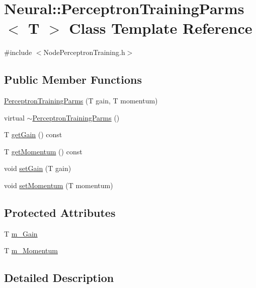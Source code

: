 \hypertarget{class_neural_1_1_perceptron_training_parms}{
\section{Neural::PerceptronTrainingParms$<$ T $>$ Class Template Reference}
\label{class_neural_1_1_perceptron_training_parms}
}


{\ttfamily \#include $<$NodePerceptronTraining.h$>$}

\subsection*{Public Member Functions}
\begin{DoxyCompactItemize}
\item 
\hyperlink{class_neural_1_1_perceptron_training_parms_a40784eca0cccf63426c0b23a8c1b5294}{PerceptronTrainingParms} (T gain, T momentum)
\item 
virtual \hyperlink{class_neural_1_1_perceptron_training_parms_a1dbdad8f7f8ad56ec69de9e3e6b34a27}{$\sim$PerceptronTrainingParms} ()
\item 
T \hyperlink{class_neural_1_1_perceptron_training_parms_a18410d759d8cf73d850235b01c7dd86a}{getGain} () const 
\item 
T \hyperlink{class_neural_1_1_perceptron_training_parms_ac4b5890cc4cea95f8e53064abedf1f6e}{getMomentum} () const 
\item 
void \hyperlink{class_neural_1_1_perceptron_training_parms_a6d7d75b1055cd7dddb6927a4f76e5f7b}{setGain} (T gain)
\item 
void \hyperlink{class_neural_1_1_perceptron_training_parms_aa20ea06d897899dba0836b4d50a21d43}{setMomentum} (T momentum)
\end{DoxyCompactItemize}
\subsection*{Protected Attributes}
\begin{DoxyCompactItemize}
\item 
T \hyperlink{class_neural_1_1_perceptron_training_parms_aea261e20f5d0108bd5be074b142eb164}{m\_\-Gain}
\item 
T \hyperlink{class_neural_1_1_perceptron_training_parms_a5db93fd54c981bfb758c8be32834df49}{m\_\-Momentum}
\end{DoxyCompactItemize}


\subsection{Detailed Description}
